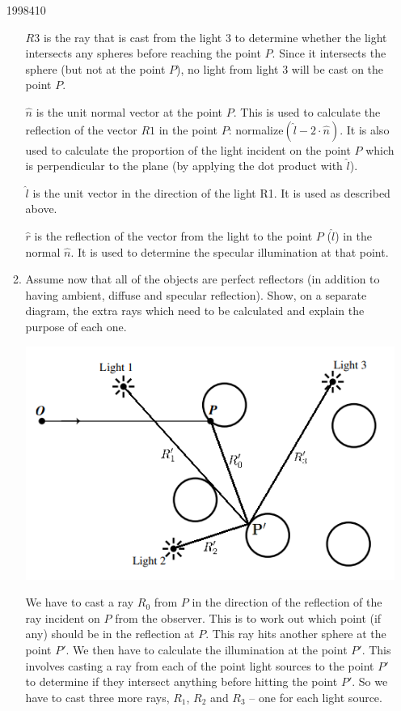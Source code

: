 \documentclass[10pt,\jkfside,a4paper]{article}
\begin{document}
\begin{enumerate}[label=(\alph*)]
\begin{examquestion}{1998}{4}{10}
\begin{enumerate}[label=(\alph*)]
$R3$ is the ray that is cast from the light 3 to determine whether the light intersects any spheres before reaching the 
point $P$. Since it intersects the sphere (but not at the point $P$), no light from light 3 will be cast on the point $P$.

$\hat n$ is the unit normal vector at the point $P$. This is used to calculate the reflection of the vector $R1$ 
in the point $P$: normalize$(\hat l - 2\cdot \hat n)$. It is also used to calculate the proportion of the light incident on the point $P$ which is 
perpendicular to the plane (by applying the dot product with $\hat l$).

$\hat l$ is the unit vector in the direction of the light R1. It is used as described above.

$\hat r$ is the reflection of the vector from the light to the point $P$ ($\hat l$) in the normal $\hat n$. 
It is used to determine the specular illumination at that point.

\item Assume now that all of the objects are perfect reflectors (in addition to 
having ambient, diffuse and specular reflection). Show, on a separate diagram, 
the extra rays which need to be calculated and explain the purpose of each one.

\includegraphics{diagram1998reflections}

We have to cast a ray $R_0$ from $P$ in the direction of the reflection of the ray incident on $P$ from the observer. 
This is to work out which point (if any) should be in the reflection at $P$. This ray hits another sphere at the point $P'$. 
We then have to calculate the illumination at the point $P'$. This involves casting a ray from each of the point light sources to 
the point $P'$ to determine if they intersect anything before hitting the point $P'$. So we have to cast three more rays, $R_1$, 
$R_2$ and $R_3$ -- one for each light source.

\end{enumerate}

\end{examquestion}

\end{enumerate}
\end{document}
